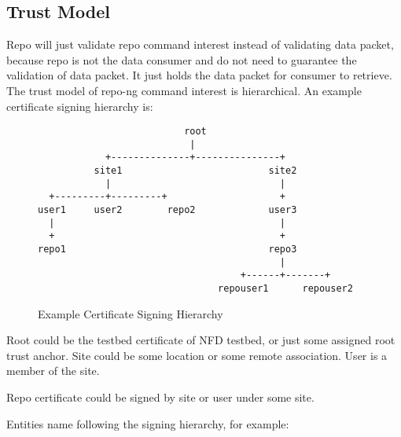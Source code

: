 \documentclass{acm_proc_article-sp}
\begin{document}
\subsection{Trust Model}

Repo will just validate repo command interest instead of validating data packet, because repo is not the data consumer and do not need to guarantee the validation of data packet. It just holds the data packet for consumer to retrieve.
The trust model of repo-ng command interest is hierarchical. An example certificate signing hierarchy is:

\begin{figure*}
\centering
\begin{BVerbatim}
                          root 
                           |          
            +--------------+---------------+
          site1                          site2
            |                              |         
  +---------+---------+                    +
user1     user2        repo2             user3
  |                                        |
  +                                        +
repo1                                    repo3
                                           |
                                    +------+-------+
                                repouser1      repouser2

\end{BVerbatim}
\caption{Example Certificate Signing Hierarchy}
\end{figure*}                                

Root could be the testbed certificate of NFD testbed, or just some assigned root trust anchor. Site could be some location or some remote association. User is a member of the site.

Repo certificate could be signed by site or user under some site.

Entities name following the signing hierarchy, for example:
\end{document}
